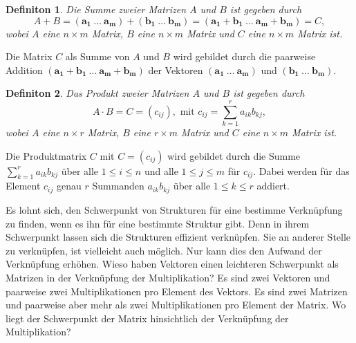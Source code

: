 \documentclass{report}
\newtheorem{definition}{Definiton}[section]
\numberwithin{equation}{section}
\begin{document}
\begin{definition}
	Die Summe zweier Matrizen $A$ und $B$ ist gegeben durch 
	$$A + B = (\boldsymbol{a_1} \: \ldots \: \boldsymbol{a_m}) + (\boldsymbol{b_1} \: \ldots \: \boldsymbol{b_m}) = (\boldsymbol{a_1} + \boldsymbol{b_1} \: \ldots \: \boldsymbol{a_m} + \boldsymbol{b_m}) = C,$$ wobei $A$ eine $n \times m$ Matrix, $B$ eine $n \times m$ Matrix und $C$ eine $n \times m$ Matrix ist.
\end{definition}
Die Matrix $C$ als Summe von $A$ und $B$ wird gebildet durch die paarweise Addition $(\boldsymbol{a_1} + \boldsymbol{b_1} \: \ldots \: \boldsymbol{a_m} + \boldsymbol{b_m})$ der Vektoren $(\boldsymbol{a_1} \: \ldots \: \boldsymbol{a_m})$ und $(\boldsymbol{b_1} \: \ldots \: \boldsymbol{b_m})$.
\begin{definition}
	Das Produkt zweier Matrizen $A$ und $B$ ist gegeben durch 
	$$A \cdot B = C = (c_{ij}), \text{ mit } c_{ij} = \sum_{k=1}^{r}a_{ik}b_{kj},$$ wobei $A$ eine $n \times r$ Matrix, $B$ eine $r \times m$ Matrix und $C$ eine $n \times m$ Matrix ist.
\end{definition}
Die Produktmatrix $C$ mit $C = (c_{ij})$ wird gebildet durch die Summe $\sum_{k=1}^{r}a_{ik}b_{kj}$ über alle $1 \leq i \leq n$ und alle $1 \leq j \leq m$ für $c_{ij}$. Dabei werden für das Element $c_{ij}$ genau $r$ Summanden $a_{ik}b_{kj}$ über alle $1 \leq k \leq r$ addiert.

Es lohnt sich, den Schwerpunkt von Strukturen für eine bestimme Verknüpfung zu finden, wenn es ihn für eine bestimmte Struktur gibt. Denn in ihrem Schwerpunkt lassen sich die Strukturen effizient verknüpfen. Sie an anderer Stelle zu verknüpfen, ist vielleicht auch möglich. Nur kann dies den Aufwand der Verknüpfung erhöhen. Wieso haben Vektoren einen leichteren Schwerpunkt als Matrizen in der Verknüpfung der Multiplikation? Es sind zwei Vektoren und paarweise zwei Multiplikationen pro Element des Vektors. Es sind zwei Matrizen und paarweise aber mehr als zwei Multiplikationen pro Element der Matrix. Wo liegt der Schwerpunkt der Matrix hinsichtlich der Verknüpfung der Multiplikation?
\end{document}
